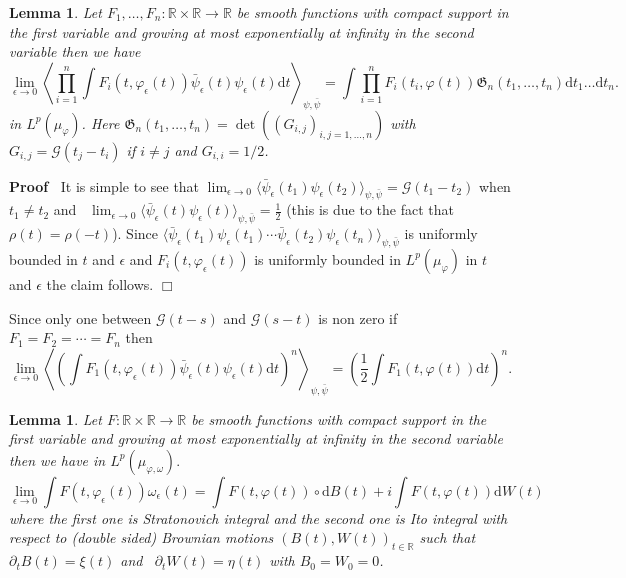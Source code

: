 \documentclass[a4paper,10pt]{article}
\newcommand{\mathd}{\mathrm{d}}
\newenvironment{proof}{\noindent\textbf{Proof\ }}{\hspace*{\fill}$\Box$\medskip}
\newtheorem{lemma}[theorem]{Lemma}
{\theorembodyfont{\rmfamily}\newtheorem{remark}[theorem]{Remark}}
\begin{document}
\begin{lemma}
  \label{lemma_limit1}Let $F_1, \ldots, F_n : \mathbb{R} \times \mathbb{R}
  \rightarrow \mathbb{R}$ be smooth functions with compact support in the
  first variable and growing at most exponentially at infinity in the second
  variable then we have
  \begin{equation}
    \lim_{\epsilon \rightarrow 0} \left\langle \prod_{i = 1}^n \int F_i (t,
    \varphi_{\epsilon} (t)) \bar{\psi}_{\epsilon} (t) \psi_{\epsilon} (t)
    \mathd t \right\rangle_{\psi, \bar{\psi}} = \int \prod_{i = 1}^n F_i (t_i,
    \varphi (t)) \mathfrak{G}_n (t_1, \ldots, t_n) \mathd t_1 \ldots \mathd
    t_n . \label{eq:determinant}
  \end{equation}
  in $L^p (\mu_{\varphi})$. Here $\mathfrak{G}_n (t_1, \ldots, t_n) = \det
  ((G_{i, j})_{i, j = 1, \ldots, n})$ with $G_{i, j} = \mathcal{G} (t_j -
  t_i)$ if $i \neq j$ and $G_{i, i} = 1 / 2$.
\end{lemma}

\begin{proof}
  It is simple to see that $\lim_{\epsilon \rightarrow 0} \langle
  \bar{\psi}_{\epsilon} (t_1) \psi_{\epsilon} (t_2) \rangle_{\psi, \bar{\psi}}
  = \mathcal{G} (t_1 - t_2)$ when $t_1 \not = t_2$ and \ $\lim_{\epsilon
  \rightarrow 0} \langle \bar{\psi}_{\epsilon} (t) \psi_{\epsilon} (t)
  \rangle_{\psi, \bar{\psi}} = \frac{1}{2}$ (this is due to the fact that
  $\rho (t) = \rho (- t)$). Since $\langle \bar{\psi}_{\epsilon} (t_1)
  \psi_{\epsilon} (t_1) \cdots \bar{\psi}_{\epsilon} (t_2) \psi_{\epsilon}
  (t_n) \rangle_{\psi, \bar{\psi}}$ is uniformly bounded in $t$ and $\epsilon$
  and $F_i (t, \varphi_{\epsilon} (t))$ is uniformly bounded in $L^p
  (\mu_{\varphi})$ in $t$ and $\epsilon$ the claim follows.
\end{proof}

\begin{remark}
  \label{remark_limit}Since only one between $\mathcal{G} (t - s)$ and
  $\mathcal{G} (s - t)$ is non zero if $F_1 = F_2 = \cdots = F_n$ then
  \[ \lim_{\epsilon \rightarrow 0} \left\langle \left( \int F_1 (t,
     \varphi_{\epsilon} (t)) \bar{\psi}_{\epsilon} (t) \psi_{\epsilon} (t)
     \mathd t \right)^n \right\rangle_{\psi, \bar{\psi}} = \left( \frac{1}{2}
     \int F_1 (t, \varphi (t)) \mathd t \right)^n . \]
\end{remark}

\begin{lemma}
  \label{lemma_limit2}Let $F : \mathbb{R} \times \mathbb{R} \rightarrow
  \mathbb{R}$ be smooth functions with compact support in the first variable
  and growing at most exponentially at infinity in the second variable then we
  have in $L^p (\mu_{\varphi, \omega}) .$
  \[ \lim_{\epsilon \rightarrow 0} \int F (t, \varphi_{\epsilon} (t))
     \omega_{\epsilon} (t) = \int F (t, \varphi (t)) \circ \mathd B (t) + i
     \int F (t, \varphi (t)) \mathd W (t) \]
  where the first one is Stratonovich integral and the second one is Ito
  integral with respect to (double sided) Brownian motions $(B (t), W (t))_{t
  \in \mathbb{R}}$ such that $\partial_t B (t) = \xi (t)$ and \ $\partial_t W
  (t) = \eta (t)$ with $B_0 = W_0 = 0$.
\end{lemma}
\end{document}
